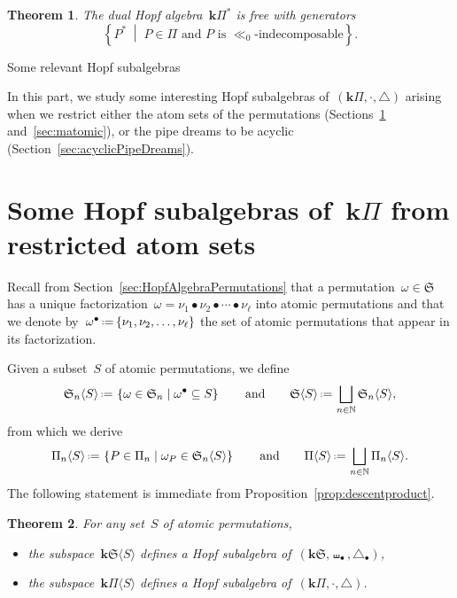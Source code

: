 \documentclass{amsart}
\makeatletter
\newtheorem{theorem}{Theorem}[section]
\theoremstyle{definition}
\newcommand{\N}{\mathbb{N}} %
\newcommand{\bk}{\mathbf{k}} %
\newcommand{\set}[2]{\left\{ #1 \;\middle|\; #2 \right\}} %
\newcommand{\eqdef}{\mbox{\,\raisebox{0.2ex}{\scriptsize\ensuremath{\mathrm:}}\ensuremath{=}\,}} %
\newcommand{\fS}{\mathfrak{S}} %
\newcommand{\gdproduct}{\bullet} %
\newcommand{\gdshuffle}{\shuffle_\gdproduct} %
\newcommand{\gddeconcat}{\coproduct_\gdproduct} %
\newcommand{\HS}{{\bk\fS}} %
\newcommand{\pipeDreams}{\Pi} %
\newcommand{\HP}{{\bk\pipeDreams}} %
\newcommand{\gammainsertion}{\ll}  %
\newcommand{\product}{\cdot} %
\newcommand{\coproduct}{\triangle} %
\def\part{\@startsection{part}{1}%
\z@{.7\linespacing\@plus\linespacing}{.8\linespacing}%
{\LARGE\sffamily\centering}}
\makeatother
\begin{document}
\begin{theorem}
The dual Hopf algebra~$\HP^*$ is free with generators 
\[
\set{P^*}{P\in\pipeDreams \text{ and $P$ is $\gammainsertion_0$-indecomposable}}.
\]
\end{theorem}


\part{Some relevant Hopf subalgebras}

In this part, we study some  interesting Hopf subalgebras of~$(\HP, \product, \coproduct)$ arising when we restrict either the atom sets of the permutations (Sections~\ref{sec:subalgebrasAtoms} and~\ref{sec:matomic}), or the pipe dreams to be acyclic (Section~\ref{sec:acyclicPipeDreams}).



\section{Some Hopf subalgebras of~$\HP$ from restricted atom sets}
\label{sec:subalgebrasAtoms}

Recall from Section~\ref{sec:HopfAlgebraPermutations} that a permutation~$\omega \in \fS$ has a unique factorization~${\omega = \nu_1 \gdproduct \nu_2 \gdproduct \cdots \gdproduct \nu_\ell}$ into atomic permutations and that we denote by~$\omega^\gdproduct \eqdef \{\nu_1, \nu_2, \dots, \nu_\ell\}$ the set of atomic permutations that appear in its factorization.

Given a subset~$S$ of atomic permutations, we define
\[
\fS_n \langle S \rangle \eqdef \set{\omega \in \fS_n}{\omega^{\gdproduct} \subseteq S}
\qquad\text{and}\qquad
\fS \langle S \rangle \eqdef \bigsqcup_{n \in \N} \fS_n \langle S \rangle,
\]
from which we derive
\[
\pipeDreams_n \langle S \rangle \eqdef \set{P \in \pipeDreams_n}{\omega_P \in \fS_n \langle S \rangle}
\qquad\text{and}\qquad
\pipeDreams \langle S \rangle \eqdef \bigsqcup_{n \in \N} \pipeDreams_n \langle S \rangle.
\]
The following statement is immediate from Proposition~\ref{prop:descentproduct}.

\begin{theorem}
For any set~$S$ of atomic permutations,
\begin{itemize}
\item the subspace~$\HS \langle S \rangle$ defines a Hopf subalgebra of~$(\HS, \gdshuffle, \gddeconcat)$,
\item the subspace~$\HP \langle S \rangle$ defines a Hopf subalgebra of~$(\HP, \product, \coproduct)$.
\end{itemize}
\end{theorem}
\end{document}
